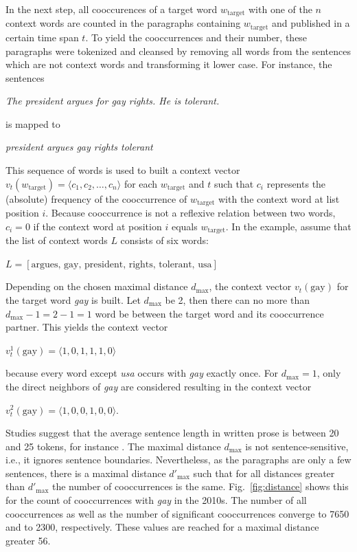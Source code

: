 \documentclass[10pt,a4paper,twocolumn]{scrartcl}
\begin{document}
In the next step, all cooccurences of a target word $w_\text{target}$ with one of the $n$ context words are counted in the paragraphs containing $w_\text{target}$ and published in a certain time span $t$. To yield the cooccurrences and their number, these paragraphs were tokenized and cleansed by removing all words from the sentences which are not context words and transforming it lower case. For instance, the sentences \begin{center}\textit{The president argues for gay rights. He is tolerant.}\end{center} is mapped to \begin{center}\textit{president argues gay rights tolerant}\end{center} This sequence of words is used to built a context vector $v_t(w_\text{target}) = \langle c_1, c_2, \ldots, c_n\rangle$ for each $w_\text{target}$ and $t$ such that $c_i$ represents the (absolute) frequency of the cooccurrence of $w_\text{target}$ with the context word at list position $i$. Because cooccurrence is not a reflexive relation between two words, $c_i = 0$ if the context word at position $i$ equals $w_\text{target}$. In the example, assume that the list of context words $L$ consists of six words: \begin{center}$L =  [\text{argues, gay, president, rights, tolerant, usa}]$\end{center} Depending on the chosen maximal distance $d_\text{max}$, the context vector $v_t(\text{gay})$ for the target word \textit{gay} is built. Let $d_\text{max}$ be 2, then there can no more than $d_\text{max} - 1 = 2 - 1 = 1$ word be between the target word and its cooccurrence partner. This yields the context vector \begin{center}$v_t^1(\text{gay}) = \langle 1, 0, 1, 1, 1, 0\rangle$\end{center} because every word except \textit{usa} occurs with \textit{gay} exactly once. For $d_\text{max} = 1$, only the direct neighbors of \textit{gay} are considered resulting in the context vector \begin{center}$v_t^2(\text{gay}) = \langle 1, 0, 0, 1, 0, 0\rangle$.\end{center} Studies suggest that the average sentence length in written prose is between 20 and 25 tokens, for instance \citep{Sichel:1974}. The maximal distance $d_\text{max}$ is not sentence-sensitive, i.e., it ignores sentence boundaries. Nevertheless, as the paragraphs are only a few sentences, there is a maximal distance $d'_\text{max}$ such that for all distances greater than $d'_\text{max}$ the number of cooccurrences is the same. Fig.~\ref{fig:distance} shows this for the count of cooccurrences with \textit{gay} in the 2010s. The number of all cooccurrences as well as the number of significant cooccurrences converge to 7650 and to 2300, respectively. These values are reached for a maximal distance greater 56.
\end{document}

